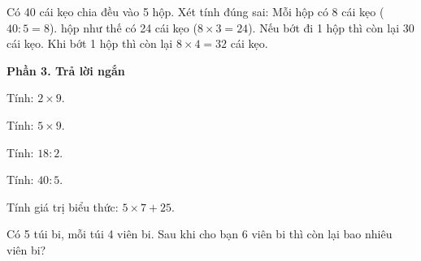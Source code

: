 \begin{ex} %
Có 40 cái kẹo chia đều vào 5 hộp. Xét tính đúng sai:
\choiceTF
{\True Mỗi hộp có 8 cái kẹo ($40 : 5 = 8$).}
{ hộp như thế có 24 cái kẹo ($8 \times 3 = 24$).}
{Nếu bớt đi 1 hộp thì còn lại 30 cái kẹo.}
{\True Khi bớt 1 hộp thì còn lại $8 \times 4 = 32$ cái kẹo.}
\end{ex}

\textbf{Phần 3. Trả lời ngắn}

\begin{ex} %
Tính: $2 \times 9$.
\end{ex}

\begin{ex} %
Tính: $5 \times 9$.
\end{ex}

\begin{ex} %
Tính: $18 : 2$.
\end{ex}

\begin{ex} %
Tính: $40 : 5$.
\end{ex}

\begin{ex} %
Tính giá trị biểu thức: $5 \times 7 + 25$.
\end{ex}

\begin{ex} %
Có 5 túi bi, mỗi túi 4 viên bi. Sau khi cho bạn 6 viên bi thì còn lại bao nhiêu viên bi?
\end{ex}
